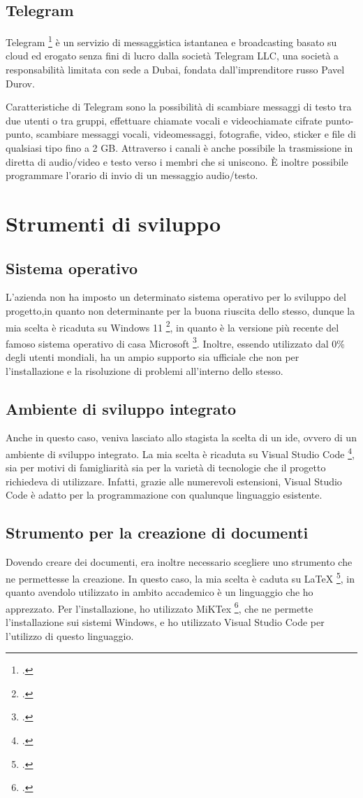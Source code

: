 \subsection{Telegram}
Telegram \footcite{site:telegram} è un servizio di messaggistica istantanea e broadcasting basato su cloud ed erogato senza fini di lucro dalla società Telegram LLC, una società a responsabilità limitata con sede a Dubai, fondata dall'imprenditore russo Pavel Durov.

Caratteristiche di Telegram sono la possibilità di scambiare messaggi di testo tra due utenti o tra gruppi, effettuare chiamate vocali e videochiamate cifrate punto-punto, scambiare messaggi vocali, videomessaggi, fotografie, video, sticker e file di qualsiasi tipo fino a 2 GB. Attraverso i canali è anche possibile la trasmissione in diretta di audio/video e testo verso i membri che si uniscono. È inoltre possibile programmare l’orario di invio di un messaggio audio/testo.

\section{Strumenti di sviluppo}

\subsection{Sistema operativo}
L'azienda non ha imposto un determinato sistema operativo per lo sviluppo del progetto,in quanto non determinante per la buona riuscita dello stesso, dunque la mia scelta è ricaduta su Windows 11 \footcite{site:w11}, in quanto è la versione più recente del famoso sistema operativo di casa Microsoft \footcite{site:microsoft}. Inoltre, essendo utilizzato dal 0\% degli utenti mondiali, ha un ampio supporto sia ufficiale che non per l'installazione e la risoluzione di problemi all'interno dello stesso.
\subsection{Ambiente di sviluppo integrato}
Anche in questo caso, veniva lasciato allo stagista la scelta di un \gls{ide}, ovvero di un ambiente di sviluppo integrato. La mia scelta è ricaduta su Visual Studio Code \footcite{site:vscode}, sia per motivi di famigliarità sia per la varietà di tecnologie che il progetto richiedeva di utilizzare. Infatti, grazie alle numerevoli estensioni, Visual Studio Code è adatto per la programmazione con qualunque linguaggio esistente.
\subsection{Strumento per la creazione di documenti}
Dovendo creare dei documenti, era inoltre necessario scegliere uno strumento che ne permettesse la creazione. In questo caso, la mia scelta è caduta su LaTeX \footcite{site:latex}, in quanto avendolo utilizzato in ambito accademico è un linguaggio che ho apprezzato. Per l'installazione, ho utilizzato MiKTex \footcite{site:miktex}, che ne permette l'installazione sui sistemi Windows, e ho utilizzato Visual Studio Code per l'utilizzo di questo linguaggio.

